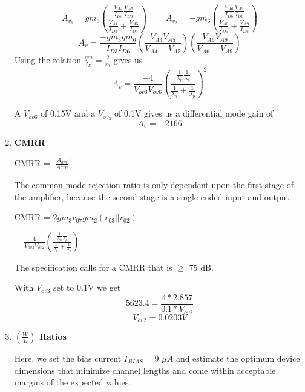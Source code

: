 \documentclass[]{article}
\begin{document}
\begin{enumerate}
		$$ A_{v_{1}} = gm_{3}\left(\frac{\frac{V_{A4}}{I_{D3}}\frac{V_{A5}}{I_{D3}}}{\frac{V_{A4}}{I_{D3}}+\frac{V_{A5}}{I_{D3}}}\right) \ \ \ \ \ \ \ \ \ \ A_{v_{2}} = -gm_{6}\left(\frac{\frac{V_{A6}}{I_{D6}}\frac{V_{A9}}{I_{D6}}}{\frac{V_{A6}}{I_{D6}}+\frac{V_{A9}}{I_{D6}}}\right)$$
		\newline
		$$ A_{v} = \frac{-gm_{3}gm_{6}}{I_{D3}I_{D6}}\left(\frac{V_{A4}V_{A5}}{V_{A4}+V_{A5}}\right)\left(\frac{V_{A6}V_{A9}}{V_{A6}+V_{A9}}\right) $$
		\newline
		Using the relation $ \frac{gm}{I_{D}} = \frac{2}{r_{0}} $ gives us
		\newline
		$$ A_{v} = \frac{-4}{V_{ov3}V_{ov6}}\left(\frac{\frac{1}{\lambda_{n}}\frac{1}{\lambda_{p}}}{\frac{1}{\lambda_{n}}+\frac{1}{\lambda_{p}}}\right)^2$$

		A $V_{ov6}$ of 0.15V and a $V_{ov_{3}}$ of 0.1V gives us a differential mode gain of
		$$ A_{v} = -2166 $$ 
		
		\pagebreak

	\item %

		{\bf CMRR}
		\newline
		\begin{center}
		CMRR = $|\frac{A_{dm}}{A{cm}}|$
		\end{center}
		
		The common mode rejection ratio is only dependent upon the first stage of the amplifier, because the second stage is a single ended input and output.
		\newline
		\begin{center}
			CMRR = $2gm_{3}r_{07}gm_{2}(r_{03} || r_{02})$

			= $\frac{4}{V_{ov3}V_{ov2}}\left(\frac{\frac{1}{\lambda_{n}}\frac{1}{\lambda_{p}}}{\frac{1}{\lambda_{n}}+\frac{1}{\lambda_{p}}}\right)$

		\end{center}
		The specification calls for a CMRR that is $\ge$ 75 dB.

		With $V_{ov3}$ set to 0.1V we get
		$$ 5623.4 = \frac{4*2.857}{0.1*V_{ov2}} $$
		$$ V_{ov2} = 0.0203V $$

		\pagebreak


	\item %
		{\bf $ \left(\frac{W}{L}\right) $ Ratios}
		\newline

		Here, we set the bias current $I_{BIAS} = 9$ $ \mu A $ and estimate the optimum device dimensions that minimize channel lengths and come within acceptable margins of the expected values.


\end{enumerate}
\end{document}
